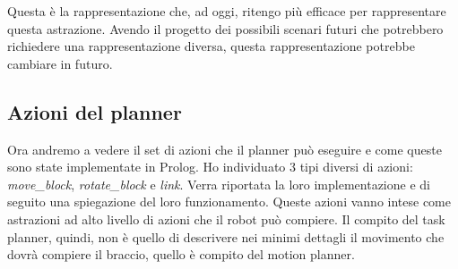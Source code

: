 Questa è la rappresentazione che, ad oggi, ritengo più efficace per rappresentare questa astrazione. Avendo il progetto dei possibili scenari futuri che potrebbero richiedere una rappresentazione diversa, questa rappresentazione potrebbe cambiare in futuro.
\subsection{Azioni del planner}
\label{subsec:azioniplanner}
Ora andremo a vedere il set di azioni che il planner può eseguire e come queste sono state implementate in Prolog. Ho individuato 3 tipi diversi di azioni:
\textit{move\_block}, \textit{rotate\_block} e \textit{link}. Verra riportata la loro implementazione e di seguito una spiegazione del loro funzionamento.
Queste azioni vanno intese come astrazioni ad alto livello di azioni che il robot può compiere. Il compito del task planner, quindi, non è quello di descrivere nei minimi dettagli il movimento che dovrà compiere il braccio, quello è compito del motion planner.

